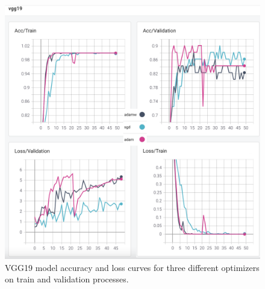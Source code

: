 \begin{figure}[!h]
	\centering
	\includegraphics[width=\linewidth]{fig/vgg19.png}
	\vspace{2mm}
	\caption{VGG19 model accuracy and loss curves for three different optimizers on train and validation processes.}
	\label{fig:vgg19_plots}
\end{figure}

